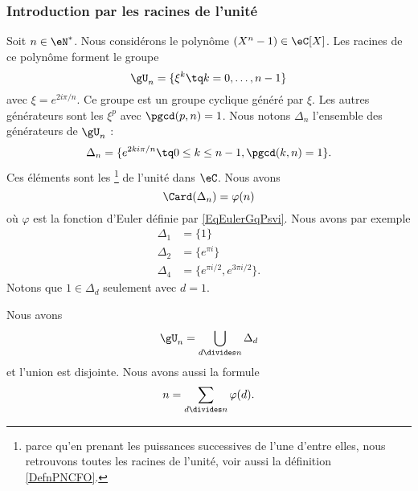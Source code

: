 \subsubsection{Introduction par les racines de l'unité}
\label{sssechZeTuL}

Soit \( n\in \eN^*\). Nous considérons le polynôme \( (X^n-1)\in\eC[X]\). Les racines de ce polynôme forment le groupe
\begin{equation}
    \gU_n=\{ \xi^k\tq k=0,\ldots, n-1 \}
\end{equation}
avec \( \xi= e^{2i\pi/n}\). Ce groupe est un groupe cyclique généré par \( \xi\). Les autres générateurs sont les \( \xi^p\) avec \( \pgcd(p,n)=1\). Nous notons \( \Delta_n\) l'ensemble des générateurs de \( \gU_n\) :
\begin{equation}
    \Delta_n=\{  e^{2ki\pi/n}\tq 0\leq k\leq n-1,\pgcd(k,n)=1 \}.
\end{equation}
Ces éléments sont les \footnote{parce qu'en prenant les puissances successives de l'une d'entre elles, nous retrouvons toutes les racines de l'unité, voir aussi la définition \ref{DefnPNCFO}.} de l'unité dans \( \eC\). Nous avons 
\begin{equation}
    \Card(\Delta_n)=\varphi(n)
\end{equation}
où \( \varphi\) est la fonction d'Euler définie par \eqref{EqEulerGqPsvi}. Nous avons par exemple
\begin{subequations}
    \begin{align}
        \Delta_1&=\{ 1 \}\\
        \Delta_2&=\{  e^{\pi i} \}\\
        \Delta_4&=\{  e^{\pi i/2}, e^{3\pi i/2} \}.
    \end{align}
\end{subequations}
Notons que \( 1\in \Delta_d\) seulement avec \( d=1\).

\begin{lemma}       \label{LemKcpjee}
    Nous avons
    \begin{equation}        \label{EqpZuIyL}
        \gU_n=\bigcup_{d\divides n}\Delta_d
    \end{equation}
    et l'union est disjointe. Nous avons aussi la formule
    \begin{equation}        \label{EqTPHqgJ}
        n=\sum_{d\divides n}\varphi(d).
    \end{equation}
\end{lemma}


